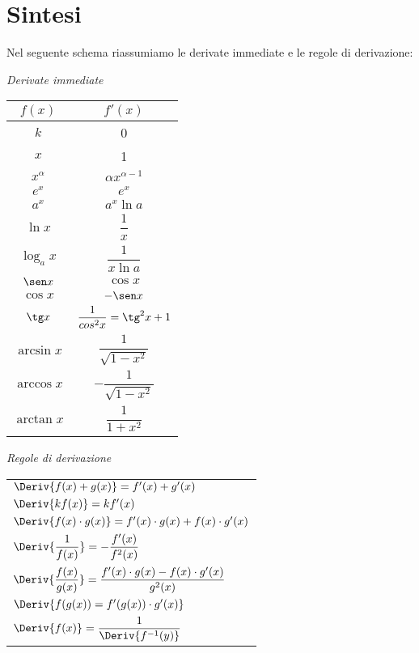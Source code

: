 \section{Sintesi}
\label{subsec:diff01_derisintesi}
Nel seguente schema riassumiamo le derivate immediate e le regole di 
derivazione:

\vspace{1em}
\begin{minipage}[c]{.48\textwidth}
\begin{center}
\emph{Derivate immediate}

\vspace{.5em}
\begin{tabular}{cc} 
\toprule
\(f(x)\) & \(f'(x)\)\\ 
\midrule 
\(k\)  & 0 \\ [6pt]
\(x\) & 1 \\ [6pt]
\(x^\alpha\) & \(\alpha x^{\alpha-1}\) \\ [6pt]
\(e^x\) & \(e^x\)\\ [6pt]
\(a^x\) & \(a^x\ln a\)\\[6pt]
\(\ln x\) & \(\dfrac{1}{x}\)\\[6pt]
\(\log_a x\) & \(\dfrac{1}{x\ln a}\)\\[6pt]
\(\sen x\) & \(\cos x\) \\ [6pt]
\(\cos x\) & \(-\sen x\) \\ [6pt]
\(\tg x\) & \(\dfrac{1}{cos^2 x}=\tg^2 x +1\) \\[6pt]
\(\arcsin x\) & \(\dfrac{1}{\sqrt{1 -x^2}}\)\\[6pt]
\(\arccos x\) & \(-\dfrac{1}{\sqrt{1 -x^2}}\)\\[6pt]
\(\arctan x\) & \(\dfrac{1}{1 +x^2}\)\\
\bottomrule
\end{tabular}
\end{center}
\end{minipage}
\hfill
\begin{minipage}[c]{.48\textwidth}
\begin{center}
\emph{Regole di derivazione}

\vspace{.5em}
\begin{tabular}{l}
\toprule
\(\Deriv{f(x)+g(x)} = f'(x)+g'(x)\)\\[8pt]
\(\Deriv{kf(x)} = kf'(x)\)\\[8pt]
\(\Deriv{f(x)\cdot g(x)} = f'(x)\cdot g(x)+f(x)\cdot g'(x)\)\\[8pt]
\(\Deriv{\dfrac{1}{f(x)}} = -\dfrac{f'(x)}{f^2(x)}\)\\[8pt]
\(\Deriv{\dfrac{f(x)}{g(x)}} = \dfrac{f'(x)\cdot g(x)-f(x)
                               \cdot g'(x)}{g^2(x)}\)\\[8pt]
\(\Deriv{f(g(x)) = f'(g(x))\cdot g'(x)}\) \\[8pt]
\(\Deriv{f(x)} = \dfrac{1}{\Deriv{f^{-1}(y)}}\)\\
\bottomrule
\end{tabular}
\end{center}
\end{minipage}




